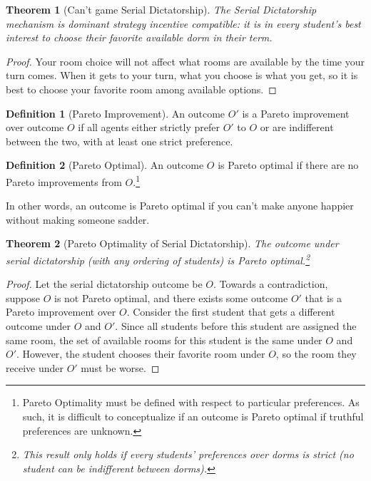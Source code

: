\documentclass[dvipsnames]{article}
\newtheorem{theorem}{Theorem}[section]
\theoremstyle{definition}
\newtheorem{definition}{Definition}[section]
\theoremstyle{remark}
\begin{document}
\begin{theorem}[Can't game Serial Dictatorship]
	The Serial Dictatorship mechanism is dominant strategy incentive compatible: it is in every student's best interest to choose their favorite available dorm in their term. 
\end{theorem}

\begin{proof}
	Your room choice will not affect what rooms are available by the time your turn comes. When it gets to your turn, what you choose is what you get, so it is best to choose your favorite room among available options.
\end{proof}

\begin{definition}[Pareto Improvement]
	An outcome $O'$ is a Pareto improvement over outcome $O$ if all agents either strictly prefer $O'$ to $O$ or are indifferent between the two, with at least one strict preference.
\end{definition}

\begin{definition}[Pareto Optimal]
	An outcome $O$ is Pareto optimal if there are no Pareto improvements from $O$.\footnote{Pareto Optimality must be defined with respect to particular preferences. As such, it is difficult to conceptualize if an outcome is Pareto optimal if truthful preferences are unknown.}
\end{definition}

In other words, an outcome is Pareto optimal if you can't make anyone happier without making someone sadder. 

\begin{theorem}[Pareto Optimality of Serial Dictatorship]
	The outcome under serial dictatorship (with any ordering of students) is Pareto optimal.\footnote{This result only holds if every students' preferences over dorms is strict (no student can be indifferent between dorms).}
\end{theorem}

\begin{proof}
	Let the serial dictatorship outcome be $O$. Towards a contradiction, suppose $O$ is not Pareto optimal, and there exists some outcome $O'$ that is a Pareto improvement over $O$. Consider the first student that gets a different outcome under $O$ and $O'$. Since all students before this student are assigned the same room, the set of available rooms for this student is the same under $O$ and $O'$. However, the student chooses their favorite room under $O$, so the room they receive under $O'$ must be worse.
\end{proof}
\end{document}
